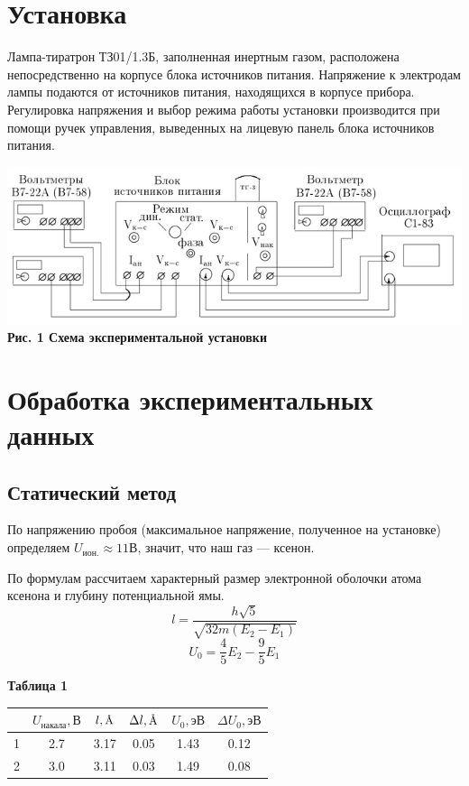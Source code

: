 \documentclass[a4paper, 12pt]{article}%
\begin{document}
	\section*{Установка}
	Лампа-тиратрон ТЗ01/1.3Б, заполненная инертным газом, расположена непосредственно на корпусе блока источников питания. Напряжение к электродам лампы подаются от источников питания, находящихся в корпусе прибора. Регулировка напряжения и выбор режима работы установки производится при помощи ручек управления, выведенных на лицевую панель блока источников питания.
	\begin{center}
		\includegraphics[width=\textwidth]{11.png}
		\textbf{Рис. 1 Схема экспериментальной установки}
	\end{center}
	\section*{Обработка экспериментальных данных}
	\subsection*{Статический метод}
	
	По напряжению пробоя (максимальное напряжение, полученное на установке) определяем $U_{ион.}\approx 11 \text{В}$, значит, что наш газ --- ксенон.
	
	По формулам рассчитаем характерный размер электронной оболочки атома ксенона и глубину потенциальной ямы.
	\begin{equation*}
		l = \frac{h\sqrt{5}}{\sqrt{32m(E_2-E_1)}}
	\end{equation*}
	\begin{equation*}
		U_0 =\frac{4}{5}E_2 - \frac{9}{5}E_1
	\end{equation*}
	\begin{center} 
		\textbf{Таблица 1} \\ 
		\begin{tabular}{|c|c|c|c|c|c|}
			\hline
			\rowcolor[HTML]{C0C0C0}
			& $U_{\text{накала}}, \text{В}$ & $l, \small{\text{Å}}$ & $\Delta l, \small{\text{Å}}$ & $U_0, \text{эВ}$ & $\Delta U_0, \text{эВ}$ \\ \hline
			\cellcolor[HTML]{C0C0C0} 1 & 2.7 & 3.17 & 0.05 & 1.43 & 0.12 \\ \hline
			\rowcolor[HTML]{EFEFEF}
			\cellcolor[HTML]{C0C0C0} 2 & 3.0 & 3.11 & 0.03 & 1.49 & 0.08 \\ \hline
		\end{tabular}
	\end{center}
\end{document}
